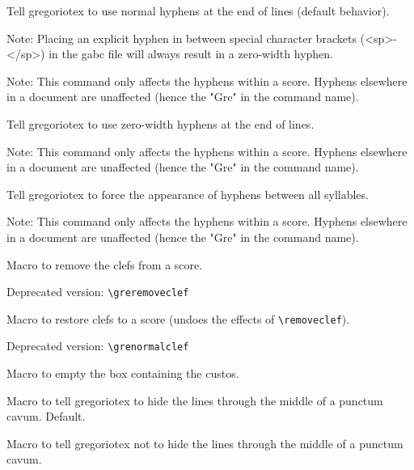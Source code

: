 Tell gregoriotex to use normal hyphens at the end of lines (default
behavior).

Note: Placing an explicit hyphen in between special character brackets
(\ie <sp>-</sp>) in the gabc file will always result in a zero-width
hyphen.

Note: This command only affects the hyphens within a score.  Hyphens
elsewhere in a document are unaffected (hence the "Gre" in the command
name).

Tell gregoriotex to use zero-width hyphens at the end of lines.

Note: This command only affects the hyphens within a score.  Hyphens
elsewhere in a document are unaffected (hence the "Gre" in the command
name).

Tell gregoriotex to force the appearance of hyphens between all
syllables.

Note: This command only affects the hyphens within a score.  Hyphens
elsewhere in a document are unaffected (hence the "Gre" in the command
name).

Macro to remove the clefs from a score.

\smallskip\hspace{15pt} Deprecated version: \verb=\greremoveclef=

Macro to restore clefs to a score (undoes the effects of
\verb=\removeclef=).

\smallskip\hspace{15pt} Deprecated version: \verb=\grenormalclef=

Macro to empty the box containing the custos.

Macro to tell gregoriotex to hide the lines through the middle of a
punctum cavum.  Default.

Macro to tell gregoriotex not to hide the lines through the middle of
a punctum cavum.

